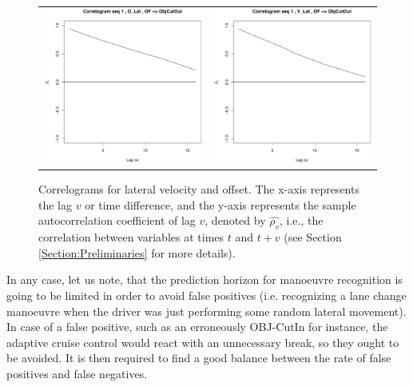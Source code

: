 \begin{figure}[ht!]
  \centering
    \begin{tabular}{cc}
    \includegraphics[width=60mm]{figures/DaimlerCorrOBJ_R15Offs.pdf}&
    \includegraphics[width=60mm]{figures/DaimlerCorrOBJ_R15Vel.pdf}\\
  \end{tabular}
    \caption{\label{Figure:daimlerCorrel}Correlograms for lateral velocity and offset. The x-axis represents the lag $v$ or time difference, and the y-axis represents the sample autocorrelation coefficient of lag $v$, denoted by $\hat{\rho_v}$, i.e., the correlation between variables at times $t$ and $t+v$ (see Section \ref{Section:Preliminaries} for more details).}
\end{figure}

In any case, let us note, that the prediction horizon for manoeuvre recognition is going to be limited in order to avoid false positives (i.e. recognizing a lane change manoeuvre when the driver was just performing some random lateral movement).  In case of a false positive, such as an erroneously OBJ-CutIn for instance, the adaptive cruise control would react with an unnecessary break, so they ought to be avoided. It is then required to find a good balance between the rate of false positives and false negatives. 

